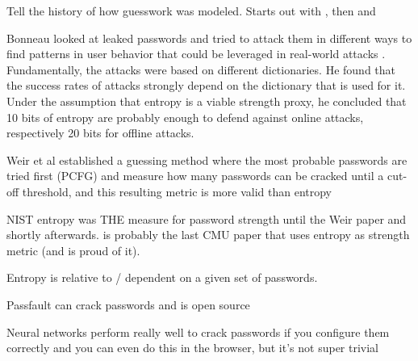 	Tell the history of how guesswork was modeled. Starts out with \cite{Weir2009PCFG, Weir2010MetricsPolicies}, then \cite{Kelley20012GuessAgain} and 
	
	
	Bonneau looked at leaked passwords and tried to attack them in different ways to find patterns in user behavior that could be leveraged in real-world attacks \cite{Bonneau2012ScienceOfGuessing}. Fundamentally, the attacks were based on different dictionaries. He found that the success rates of attacks strongly depend on the dictionary that is used for it. Under the assumption that entropy is a viable strength proxy, he concluded that 10 bits of entropy are probably enough to defend against online attacks, respectively 20 bits for offline attacks. 
	
	Weir et al established a guessing method where the most probable passwords are tried first (PCFG) and measure how many passwords can be cracked until a cut-off threshold, and this resulting metric is more valid than entropy \cite{Weir2010MetricsPolicies}
	
	NIST entropy was THE measure for password strength until the Weir paper and shortly afterwards. \cite{Komanduri2011OfPasswordsAndPeople} is probably the last CMU paper that uses entropy as strength metric (and is proud of it).
	
	Entropy is relative to / dependent on a given set of passwords. 
	
	Passfault can crack passwords and is open source \cite{Paiva2017Passfault}
	
	Neural networks perform really well to crack passwords if you configure them correctly and you can even do this in the browser, but it's not super trivial \cite{Melicher2016NeuralNetworks}
	
	
